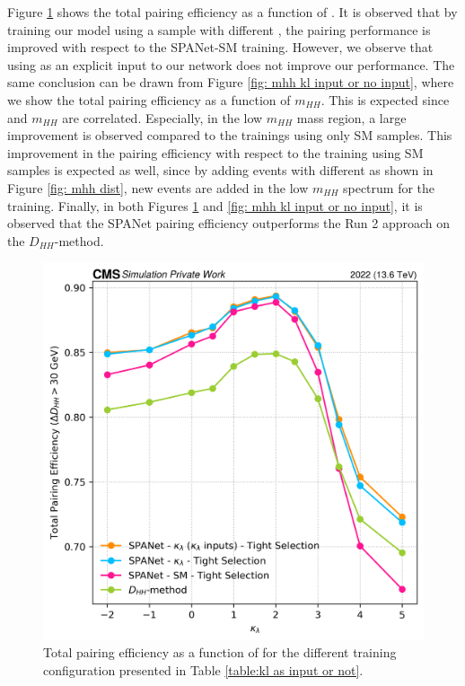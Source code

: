 
Figure \ref{fig: kl kl input or no input} shows the total pairing efficiency as a function of \kl. It is observed that by training our model using a sample with different \kl, the pairing performance is improved with respect to the SPANet-SM training. However, we observe that using \kl as an explicit input to our network does not improve our performance. The same conclusion can be drawn from Figure \ref{fig: mhh kl input or no input}, where we show the total pairing efficiency as a function of $m_{HH}$. This is expected since \kl and $m_{HH}$ are correlated. Especially, in the low $m_{HH}$ mass region, a large improvement is observed compared to the trainings using only SM samples. This improvement in the pairing efficiency with respect to the training using SM samples is expected as well, since by adding events with different \kl as shown in Figure \ref{fig: mhh dist}, new events are added in the low $m_{HH}$ spectrum for the training. Finally, in both Figures \ref{fig: kl kl input or no input} and \ref{fig: mhh kl input or no input}, it is observed that the SPANet pairing efficiency outperforms the Run 2 approach on the $D_{HH}$-method.

\begin{figure}[hbt]
    \centering
    \includegraphics[width=0.6\linewidth]{Images/6.Improving/kappa lambda/kl inout vs no input.png}
    \caption{Total pairing efficiency as a function of \kl for the different training configuration presented in Table \ref{table:kl as input or not}.}
    \label{fig: kl kl input or no input}
\end{figure}

